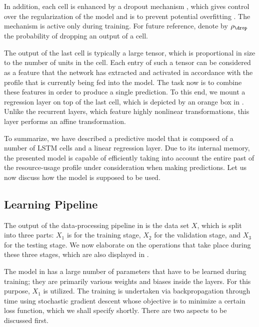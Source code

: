 In addition, each cell is enhanced by a dropout mechanism \cite{zaremba2014},
which gives control over the regularization of the model and is to prevent
potential overfitting \cite{hastie2013}. The mechanism is active only during
training. For future reference, denote by $\rho_\drop$ the probability of
dropping an output of a cell.

The output of the last cell is typically a large tensor, which is proportional
in size to the number of units in the cell. Each entry of such a tensor can be
considered as a feature that the network has extracted and activated in
accordance with the profile that is currently being fed into the model. The task
now is to combine these features in order to produce a single prediction. To
this end, we mount a regression layer on top of the last cell, which is depicted
by an orange box in . Unlike the recurrent layers, which
feature highly nonlinear transformations, this layer performs an affine
transformation.

To summarize, we have described a predictive model that is composed of a number
of \ac{LSTM} cells and a linear regression layer. Due to its internal memory,
the presented model is capable of efficiently taking into account the entire
past of the resource-usage profile under consideration when making predictions.
Let us now discuss how the model is supposed to be used.

\subsection{Learning Pipeline}

The output of the data-processing pipeline in  is the data set $X$,
which is split into three parts: $X_1$ is for the training stage, $X_2$ for the
validation stage, and $X_3$ for the testing stage. We now elaborate on the
operations that take place during these three stages, which are also displayed
in .

The model in  has a large number of parameters that have to be
learned during training; they are primarily various weights and biases inside
the layers. For this purpose, $X_1$ is utilized. The training is undertaken via
backpropagation through time using stochastic gradient descent
\cite{goodfellow2016} whose objective is to minimize a certain loss function,
which we shall specify shortly. There are two aspects to be discussed first.

